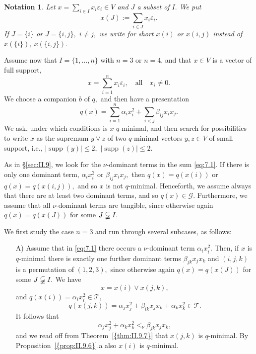 \documentclass [12pt,a4paper,reqno]{amsart}
\newtheorem{notation}[thm]{Notation}
\begin{document}
\begin{notation}\label{notation:7.1}
Let $x=\sum\limits_{i\in I} x_i{\varepsilon}_i\in V$ and $ J $ a subset of $I.$ We put
$$x( J ):=\sum_{i\in  J } x_i{\varepsilon}_i.$$
If $ J =\{i\}$ or $ J =\{i,j\},$ $i\ne j,$ we
 write for short $x(i)$ or $x(i,j)$ instead of $x(\{i\})$, $x(\{i,j
\}).$
\end{notation}

Assume now that $I=\{1,\dots,n\}$ with $n=3$ or $n=4$, and that
$x\in V$ is a vector of full support,
$$x=\sum_{i=1}^n x_i{\varepsilon}_i,\quad\text{all}\quad x_i\ne0.$$
We choose a companion $b$ of $q,$ and then have a presentation
\begin{equation}\label{eq:7.1}
q(x)=\sum_{i=1}^n{\alpha}_ix_i^2+\sum_{i<j}{\beta}_{ij}x_ix_j.
\end{equation}
We ask, under which conditions is $x$ $q$-minimal, and then search
for possibilities to write $x$ as the supremum $y\vee z$ of two
$q$-minimal vectors $y,z\in V$ of small support, i.e., $|{\operatorname{supp}}
(y) |\le 2,$ $|{\operatorname{supp}} (z)|\le 2.$

As in \S\ref{sec:II.9}, we look for the $\nu$-dominant terms in the
sum \eqref{eq:7.1}. If there is only one dominant term,
${\alpha}_ix_i^2$ or ${\beta}_{ij}x_ix_j,$ then $q(x)=q(x(i))$ or
$q(x)=q(x(i,j)),$ and so $x$ is not $q$-minimal. Henceforth, we
assume always that there are at least two dominant terms, and so
$q(x)\in{\mathcal G}.$ Furthermore,  we assume that all $\nu$-dominant terms
are tangible, since otherwise again $q(x)=q(x( J ))$ for some
$ J \varsubsetneqq I.$

We first study the case $n=3 $ and run through several subcases,
as follows:

\begin{enumerate}
\item[A)] Assume that in \eqref{eq:7.1} there occurs a
$\nu$-dominant term ${\alpha}_ix_i^2.$ Then, if $x$ is $q$-minimal
there is exactly one further dominant terms ${\beta}_{jk}x_jx_k$ and
$(i,j,k)$ is a permutation of $(1,2,3), $ since otherwise again
$q(x)=q(x(J))$ for some $ J \varsubsetneqq I.$ We have
$$x=x(i)\vee x(j,k),$$
and $q(x(i))={\alpha}_ix_i^2\in {\mathcal T},$
$$q(x(j,k))={\alpha}_jx_j^2+{\beta}_{ik}x_jx_k+{\alpha}_kx_k^2\in {\mathcal T}.$$
It follows that
$${\alpha}_jx_j^2+{\alpha}_kx_k^2<_\nu {\beta}_{jk}x_jx_k,$$
and we read off from {Theorem~\ref{{thm:II.9.7}}}  that
$x(j,k)$ is $q$-minimal. By {Proposition~\ref{{prop:II.9.6}}}.a also $x(i)$ is
$q$-minimal.
\end{enumerate}
\end{document}

